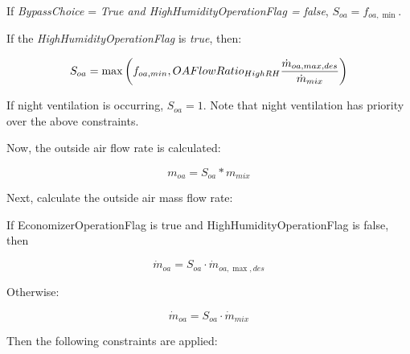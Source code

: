 If \emph{BypassChoice} = \emph{True and HighHumidityOperationFlag = false}, \({S_{oa}} = {f_{oa,\min }}\).

If the \emph{HighHumidityOperationFlag} is \emph{true}, then:

\begin{equation}
  S_{oa} = \max\left(f_{oa,min},OAFlowRatio_{HighRH}\frac{\dot{m}_{oa,max,des}}{\dot{m}_{mix}}\right)
\end{equation}

If night ventilation is occurring, \({S_{oa}} = 1\).  Note that night ventilation has priority over the above constraints.

Now, the outside air flow rate is calculated:

\begin{equation}
{m_{oa}} = {S_{oa}}*{m_{mix}}
\end{equation}

Next, calculate the outside air mass flow rate:

If EconomizerOperationFlag is true and HighHumidityOperationFlag is false, then

\begin{equation}
{\dot m_{oa}} = {S_{oa}}\cdot {\dot m_{oa,\max ,des}}
\end{equation}

Otherwise:

\begin{equation}
{\dot m_{oa}} = {S_{oa}}\cdot {\dot m_{mix}}
\end{equation}

Then the following constraints are applied:


